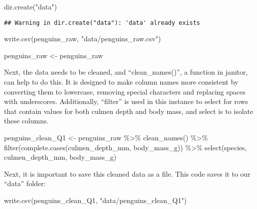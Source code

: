 \documentclass[
]{article}
\newenvironment{Shaded}{\begin{snugshade}}{\end{snugshade}}
\newcommand{\FunctionTok}[1]{\textcolor[rgb]{0.00,0.00,0.00}{#1}}
\newcommand{\NormalTok}[1]{#1}
\newcommand{\OtherTok}[1]{\textcolor[rgb]{0.56,0.35,0.01}{#1}}
\newcommand{\SpecialCharTok}[1]{\textcolor[rgb]{0.00,0.00,0.00}{#1}}
\newcommand{\StringTok}[1]{\textcolor[rgb]{0.31,0.60,0.02}{#1}}
\begin{document}
\begin{Shaded}
\begin{Highlighting}[]
\FunctionTok{dir.create}\NormalTok{(}\StringTok{"data"}\NormalTok{)}
\end{Highlighting}
\end{Shaded}

\begin{verbatim}
## Warning in dir.create("data"): 'data' already exists
\end{verbatim}

\begin{Shaded}
\begin{Highlighting}[]
\FunctionTok{write.csv}\NormalTok{(penguins\_raw, }\StringTok{"data/penguins\_raw.csv"}\NormalTok{)}

\NormalTok{penguins\_raw }\OtherTok{\textless{}{-}}\NormalTok{ penguins\_raw}
\end{Highlighting}
\end{Shaded}

Next, the data needs to be cleaned, and ``clean\_names()'', a function
in janitor, can help to do this. It is designed to make column names
more consistent by converting them to lowercase, removing special
characters and replacing spaces with underscores. Additionally,
``filter'' is used in this instance to select for rows that contain
values for both culmen depth and body mass, and select is to isolate
these columns.

\begin{Shaded}
\begin{Highlighting}[]
\NormalTok{penguins\_clean\_Q1 }\OtherTok{\textless{}{-}}\NormalTok{ penguins\_raw }\SpecialCharTok{\%\textgreater{}\%}
  \FunctionTok{clean\_names}\NormalTok{() }\SpecialCharTok{\%\textgreater{}\%}  
  \FunctionTok{filter}\NormalTok{(}\FunctionTok{complete.cases}\NormalTok{(culmen\_depth\_mm, body\_mass\_g)) }\SpecialCharTok{\%\textgreater{}\%}
  \FunctionTok{select}\NormalTok{(species, culmen\_depth\_mm, body\_mass\_g)}
\end{Highlighting}
\end{Shaded}

Next, it is important to save this cleaned data as a file. This code
saves it to our ``data'' folder:

\begin{Shaded}
\begin{Highlighting}[]
\FunctionTok{write.csv}\NormalTok{(penguins\_clean\_Q1, }\StringTok{"data/penguins\_clean\_Q1"}\NormalTok{)}
\end{Highlighting}
\end{Shaded}
\end{document}
